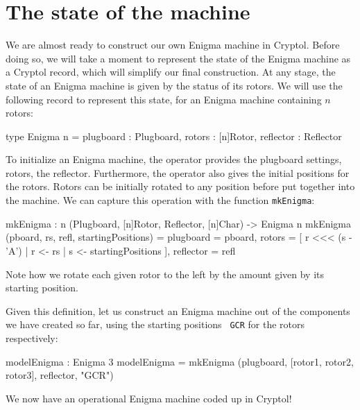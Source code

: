 \section{The state of the machine}
\label{sec:state-machine}

We are almost ready to construct our own Enigma machine in
Cryptol. Before doing so, we will take a moment to represent the state
of the Enigma machine as a Cryptol record\indTheRecordType, which will
simplify our final construction. At any stage, the state of an Enigma
machine is given by the status of its rotors. We will use the
following record to represent this state, for an Enigma machine
containing $n$ rotors:
\begin{code}
  type Enigma n = { plugboard : Plugboard,
                    rotors    : [n]Rotor,
                    reflector : Reflector
                  }
\end{code}
To initialize an Enigma machine, the operator provides the plugboard
settings, rotors, the reflector. Furthermore, the operator also gives
the initial positions for the rotors.  Rotors can be initially rotated
to any position before put together into the machine. We can capture
this operation with the function {\tt mkEnigma}:
\begin{code}
  mkEnigma : {n} (Plugboard, [n]Rotor, Reflector, [n]Char) 
                 -> Enigma n
  mkEnigma (pboard, rs, refl, startingPositions) =
      { plugboard  = pboard,
        rotors     = [ r <<< (s - 'A')
                     | r <- rs
                     | s <- startingPositions
                     ],
        reflector  = refl
      }
\end{code}
Note how we rotate each given rotor to the left by the amount given by
its starting position.


Given this definition, let us construct an Enigma machine out of the
components we have created so far, using the starting positions {\tt
  GCR} for the rotors respectively:\label{def:modelEnigma}
\begin{code}
  modelEnigma : Enigma 3
  modelEnigma = mkEnigma (plugboard, [rotor1, rotor2, rotor3], 
                          reflector, "GCR")
\end{code}
We now have an operational Enigma machine coded up in Cryptol!

